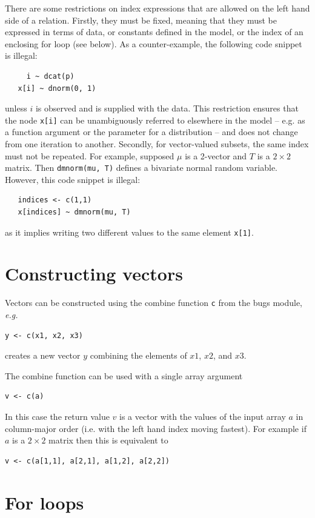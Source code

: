 \documentclass[11pt, a4paper, titlepage]{report}
\begin{document}
There are some restrictions on index expressions that are allowed on
the left hand side of a relation. Firstly, they must be fixed, meaning
that they must be expressed in terms of data, or constants defined in
the model, or the index of an enclosing for loop (see below).  As
a counter-example, the following code snippet is illegal:
\begin{verbatim}
     i ~ dcat(p)
   x[i] ~ dnorm(0, 1)

\end{verbatim}
unless $i$ is observed and is supplied with the data. This restriction
ensures that the node \verb+x[i]+ can be unambiguously referred to
elsewhere in the model -- e.g. as a function argument or the parameter
for a distribution -- and does not change from one iteration to
another. Secondly, for vector-valued subsets, the same index must not
be repeated. For example, supposed $\mu$ is a 2-vector and $T$ is a
$2 \times 2$ matrix. Then \verb+dmnorm(mu, T)+ defines a bivariate
normal random variable.  However, this code snippet is illegal:
\begin{verbatim}
   indices <- c(1,1)
   x[indices] ~ dmnorm(mu, T)
\end{verbatim}
as it implies writing two different values to the same element \verb+x[1]+.

\section{Constructing vectors}

Vectors can be constructed using the combine function \texttt{c} from
the \textsf{bugs} module, {\em  e.g.}
\begin{verbatim}
y <- c(x1, x2, x3)
\end{verbatim}
creates a new vector $y$ combining the elements of $x1$, $x2$, and $x3$.    

The combine function can be used with a single array argument
\begin{verbatim}
v <- c(a)
\end{verbatim}
In this case the return value $v$ is a vector with the values of the
input array $a$ in column-major order (i.e. with the left hand index
moving fastest). For example if $a$ is a $2 \times 2$ matrix then
this is equivalent to
\begin{verbatim}
v <- c(a[1,1], a[2,1], a[1,2], a[2,2])
\end{verbatim}

\section{For loops}
\label{section:forloops}
\end{document}
